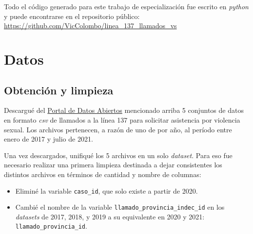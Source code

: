 \documentclass[10 pt]{article}
\begin{document}
Todo el código generado para este trabajo de especialización fue escrito en \textit{python} y puede encontrarse en el repositorio público: \url{https://github.com/VicColombo/linea_137_llamados_vs}


\section{Datos}\label{datos}

\subsection{Obtención y limpieza}\label{limpieza}
Descargué del \href{http://datos.jus.gob.ar/}{Portal de Datos Abiertos} mencionado arriba 5 conjuntos de datos en formato \textit{csv} de llamados a la línea 137 para solicitar asistencia por violencia sexual. Los archivos pertenecen, a razón de uno de por año, al período entre enero de 2017 y julio de 2021. 

Una vez descargados, unifiqué los 5 archivos en un solo \textit{dataset}. Para eso fue necesario realizar una primera limpieza destinada a dejar consistentes los distintos archivos en términos de cantidad y nombre de columnas:

\begin{itemize}
    \item Eliminé la variable \texttt{caso\_id}, que solo existe a partir de 2020.
    \item Cambié el nombre de la variable \texttt{llamado\_provincia\_indec\_id} en los \textit{datasets} de 2017, 2018, y 2019 a su equivalente en 2020 y 2021: \texttt{llamado\_provincia\_id}.
\end{itemize}
\end{document}
